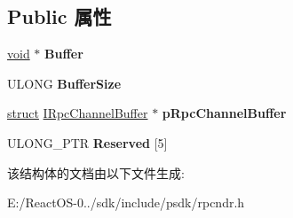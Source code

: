 \subsection*{Public 属性}
\begin{DoxyCompactItemize}
\item 
\mbox{\label{struct___n_d_r___u_s_e_r___m_a_r_s_h_a_l___i_n_f_o___l_e_v_e_l1_a03e3e8dbe00a82597acc2bc612a28b4a}} 
\hyperlink{interfacevoid}{void} $\ast$ {\bfseries Buffer}
\item 
\mbox{\label{struct___n_d_r___u_s_e_r___m_a_r_s_h_a_l___i_n_f_o___l_e_v_e_l1_a2dcf004abeb1b6bff0f05f66820bedac}} 
U\+L\+O\+NG {\bfseries Buffer\+Size}
\item 
\mbox{\label{struct___n_d_r___u_s_e_r___m_a_r_s_h_a_l___i_n_f_o___l_e_v_e_l1_ab0937181e4765e1ce355839c73b6a6ea}} 
\hyperlink{interfacestruct}{struct} \hyperlink{interface_i_rpc_channel_buffer}{I\+Rpc\+Channel\+Buffer} $\ast$ {\bfseries p\+Rpc\+Channel\+Buffer}
\item 
\mbox{\label{struct___n_d_r___u_s_e_r___m_a_r_s_h_a_l___i_n_f_o___l_e_v_e_l1_a43b9802b823485bba7ea3c93b4001b25}} 
U\+L\+O\+N\+G\+\_\+\+P\+TR {\bfseries Reserved} \mbox{[}5\mbox{]}
\end{DoxyCompactItemize}


该结构体的文档由以下文件生成\+:\begin{DoxyCompactItemize}
\item 
E\+:/\+React\+O\+S-\/0../sdk/include/psdk/rpcndr.\+h\end{DoxyCompactItemize}
